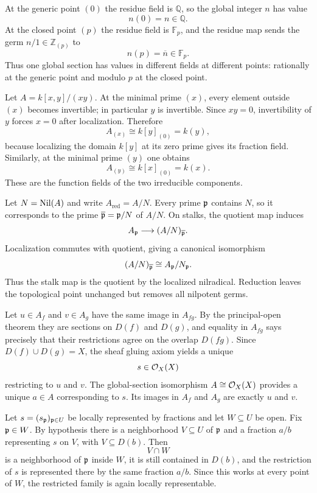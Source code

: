 \begin{solution}[Exercise VI.17.20]
At the generic point $(0)$ the residue field is $\mathbb Q$, so the global integer $n$ has value
\[
n(0)=n\in\mathbb Q.
\]
At the closed point $(p)$ the residue field is $\mathbb F_p$, and the residue map sends the germ $n/1\in\mathbb Z_{(p)}$ to
\[
n(p)=\overline n\in\mathbb F_p.
\]
Thus one global section has values in different fields at different points: rationally at the generic point and modulo $p$ at the closed point.
\end{solution}

\begin{solution}[Exercise VI.17.21]
Let $A=k[x,y]/(xy)$.  At the minimal prime $(x)$, every element outside $(x)$ becomes invertible; in particular $y$ is invertible.  Since $xy=0$, invertibility of $y$ forces $x=0$ after localization.  Therefore
\[
A_{(x)}\cong k[y]_{(0)}=k(y),
\]
because localizing the domain $k[y]$ at its zero prime gives its fraction field.
Similarly, at the minimal prime $(y)$ one obtains
\[
A_{(y)}\cong k[x]_{(0)}=k(x).
\]
These are the function fields of the two irreducible components.
\end{solution}

\begin{solution}[Exercise VI.17.22]
Let $N=\operatorname{Nil}(A)$ and write $A_{\mathrm{red}}=A/N$.  Every prime $\mathfrak p$ contains $N$, so it corresponds to the prime $\overline{\mathfrak p}=\mathfrak p/N$ of $A/N$.  On stalks, the quotient map induces
\[
A_{\mathfrak p}\longrightarrow (A/N)_{\overline{\mathfrak p}}.
\]
Localization commutes with quotient, giving a canonical isomorphism
\[
(A/N)_{\overline{\mathfrak p}}\cong A_{\mathfrak p}/N_{\mathfrak p}.
\]
Thus the stalk map is the quotient by the localized nilradical.  Reduction leaves the topological point unchanged but removes all nilpotent germs.
\end{solution}

\begin{solution}[Exercise VI.17.23]
Let $u\in A_f$ and $v\in A_g$ have the same image in $A_{fg}$.  By the principal-open theorem they are sections on $D(f)$ and $D(g)$, and equality in $A_{fg}$ says precisely that their restrictions agree on the overlap $D(fg)$.  Since $D(f)\cup D(g)=X$, the sheaf gluing axiom yields a unique
\[
s\in\mathcal O_X(X)
\]
restricting to $u$ and $v$.  The global-section isomorphism $A\cong\mathcal O_X(X)$ provides a unique $a\in A$ corresponding to $s$.  Its images in $A_f$ and $A_g$ are exactly $u$ and $v$.
\end{solution}

\begin{solution}[Exercise VI.17.24]
Let $s=(s_{\mathfrak p})_{\mathfrak p\in U}$ be locally represented by fractions and let $W\subseteq U$ be open.  Fix $\mathfrak p\in W$.  By hypothesis there is a neighborhood $V\subseteq U$ of $\mathfrak p$ and a fraction $a/b$ representing $s$ on $V$, with $V\subseteq D(b)$.  Then
\[
V\cap W
\]
is a neighborhood of $\mathfrak p$ inside $W$, it is still contained in $D(b)$, and the restriction of $s$ is represented there by the same fraction $a/b$.  Since this works at every point of $W$, the restricted family is again locally representable.
\end{solution}


